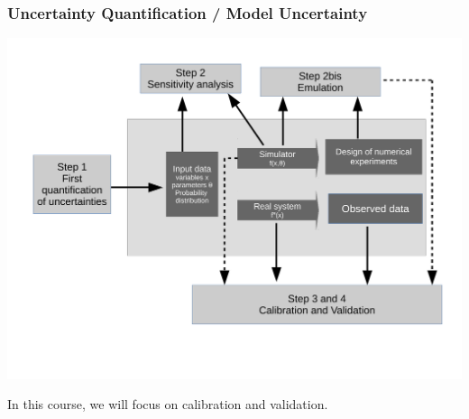 \documentclass[nopagenumber,9pt]{beamer}
\begin{document}
\begin{frame}
\frametitle{Uncertainty Quantification / Model Uncertainty}

{\centering
\includegraphics[scale=.25]{SchemaUQ.pdf}}


In this course, we will focus on calibration and validation.

\bigskip



\end{frame}
\end{document}
